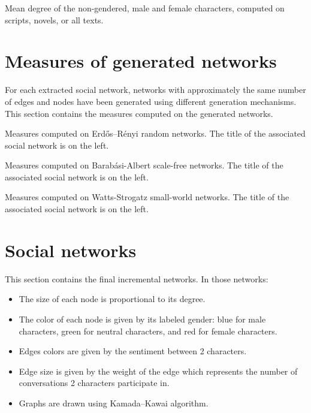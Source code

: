 \documentclass[a4paper, 12pt]{report}
\begin{document}
\begin{appendices}
\begin{table}[]
\caption{Mean degree of the non-gendered, male and female characters, computed on scripts, novels, or all texts. }
\label{gender_degree_all}
\end{table}


\chapter{Measures of generated networks}
\label{measures_generated}
For each extracted social network, networks with approximately the same number of edges and nodes have been generated using different generation mechanisms. This section contains the measures computed on the generated networks.


\begin{table}[]
\caption{Measures computed on Erdős–Rényi random networks. The title of the associated social network is on the left.}
\end{table}


\begin{table}[]
\caption{Measures computed on Barabási-Albert scale-free networks. The title of the associated social network is on the left.}
\end{table}


\begin{table}[]
\caption{Measures computed on Watts-Strogatz small-world networks. The title of the associated social network is on the left.}
\end{table}


\chapter{Social networks}
This section contains the final incremental networks. In those networks:
\begin{itemize}
\item The size of each node is proportional to its degree.
\item The color of each node is given by its labeled gender: blue for male characters, green for neutral characters, and red for female characters.
\item Edges colors are given by the sentiment between 2 characters.
\item Edge size is given by the weight of the edge which represents the number of conversations 2 characters participate in.
\item Graphs are drawn using Kamada–Kawai algorithm.
\end{itemize}
\label{final_sn}
%


\end{appendices}
\end{document}
